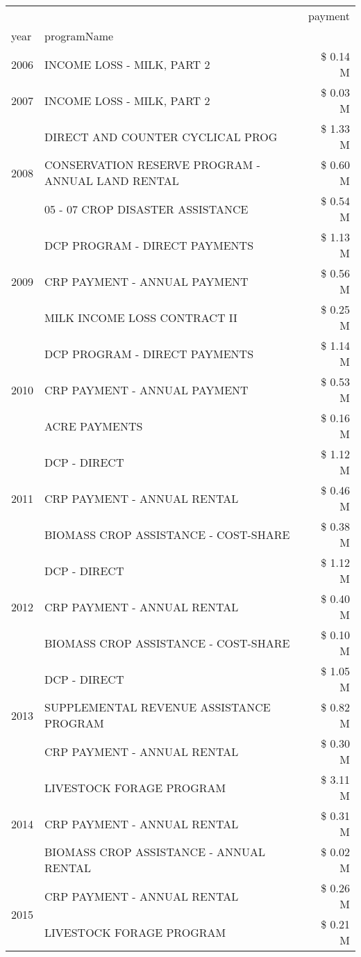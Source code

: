 \begin{tabular}{llr}
\toprule
 &  & payment \\
year & programName &  \\
\midrule
2006 & INCOME LOSS - MILK, PART 2 & \$ 0.14 M \\
\cline{1-3}
2007 & INCOME LOSS - MILK, PART 2 & \$ 0.03 M \\
\cline{1-3}
\multirow[t]{3}{*}{2008} & DIRECT AND COUNTER CYCLICAL PROG & \$ 1.33 M \\
 & CONSERVATION RESERVE PROGRAM - ANNUAL LAND RENTAL & \$ 0.60 M \\
 & 05 - 07 CROP DISASTER ASSISTANCE & \$ 0.54 M \\
\cline{1-3}
\multirow[t]{3}{*}{2009} & DCP PROGRAM - DIRECT PAYMENTS & \$ 1.13 M \\
 & CRP PAYMENT - ANNUAL PAYMENT & \$ 0.56 M \\
 & MILK INCOME LOSS CONTRACT II & \$ 0.25 M \\
\cline{1-3}
\multirow[t]{3}{*}{2010} & DCP PROGRAM - DIRECT PAYMENTS & \$ 1.14 M \\
 & CRP PAYMENT - ANNUAL PAYMENT & \$ 0.53 M \\
 & ACRE PAYMENTS & \$ 0.16 M \\
\cline{1-3}
\multirow[t]{3}{*}{2011} & DCP - DIRECT & \$ 1.12 M \\
 & CRP PAYMENT - ANNUAL RENTAL & \$ 0.46 M \\
 & BIOMASS CROP ASSISTANCE - COST-SHARE & \$ 0.38 M \\
\cline{1-3}
\multirow[t]{3}{*}{2012} & DCP - DIRECT & \$ 1.12 M \\
 & CRP PAYMENT - ANNUAL RENTAL & \$ 0.40 M \\
 & BIOMASS CROP ASSISTANCE - COST-SHARE & \$ 0.10 M \\
\cline{1-3}
\multirow[t]{3}{*}{2013} & DCP - DIRECT & \$ 1.05 M \\
 & SUPPLEMENTAL REVENUE ASSISTANCE PROGRAM & \$ 0.82 M \\
 & CRP PAYMENT - ANNUAL RENTAL & \$ 0.30 M \\
\cline{1-3}
\multirow[t]{3}{*}{2014} & LIVESTOCK FORAGE PROGRAM & \$ 3.11 M \\
 & CRP PAYMENT - ANNUAL RENTAL & \$ 0.31 M \\
 & BIOMASS CROP ASSISTANCE - ANNUAL RENTAL & \$ 0.02 M \\
\cline{1-3}
\multirow[t]{3}{*}{2015} & CRP PAYMENT - ANNUAL RENTAL & \$ 0.26 M \\
 & LIVESTOCK FORAGE PROGRAM & \$ 0.21 M \\

\end{tabular}
